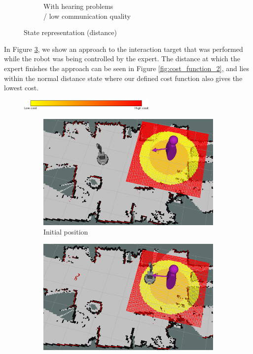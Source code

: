 \documentclass[a4paper,11pt]{report}
\begin{document}
\begin{figure}
\begin{subfigure}[b]{0.45\textwidth}
        \caption{With hearing problems\\ / low communication quality}
        \label{fig:state_res_distance_2}
    \end{subfigure}
    \caption{State representation (distance)}
    \label{fig:state_res_distance}
\end{figure}

In Figure \ref{fig:cost_function_1}, we show an approach to the interaction target that was performed while the robot was being controlled by the expert. The distance at which the expert finishes the approach can be seen in Figure \ref{fig:cost_function_2}, and lies within the normal distance state where our defined cost function also gives the lowest cost.

\begin{figure}
    \centering
    \includegraphics[width=0.6\textwidth]{figures/colour_bar.png}
    \begin{subfigure}[b]{0.45\textwidth}
        \includegraphics[width=\textwidth]{figures/cost_function_1.png}
        \caption{Initial position}
        \label{fig:cost_function_1}
    \end{subfigure}
    \begin{subfigure}[b]{0.45\textwidth}
        \includegraphics[width=\textwidth]{figures/cost_function_2.png}

\end{subfigure}
\end{figure}
\end{document}
